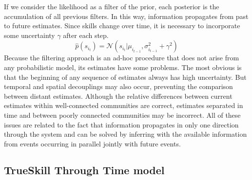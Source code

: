 \documentclass[article]{jss}
\newcommand{\N}{\mathcal{N}}
\begin{document}
If we consider the likelihood as a filter of the prior, each posterior is the accumulation of all previous filters. 
In this way, information propagates from past to future estimates. 
Since skills change over time, it is necessary to incorporate some uncertainty $\gamma$ after each step. 
%
\begin{equation}\label{eq:dynamic_factor}
 \widehat{p}(s_{i_t}) = \N(s_{i_t} | \mu_{i_{t-1}}, \sigma_{i_{t-1}}^2 + \gamma^2 )
\end{equation}
Because the filtering approach is an ad-hoc procedure that does not arise from any probabilistic model, its estimates have some problems. 
The most obvious is that the beginning of any sequence of estimates always has high uncertainty. 
But temporal and spatial decouplings may also occur, preventing the comparison between distant estimates. 
Although the relative differences between current estimates within well-connected communities are correct, estimates separated in time and between poorly connected communities may be incorrect. 
All of these issues are related to the fact that information propagates in only one direction through the system and can be solved by inferring with the available information from events occurring in parallel jointly with future events. 

\subsection{TrueSkill Through Time model}
\end{document}
